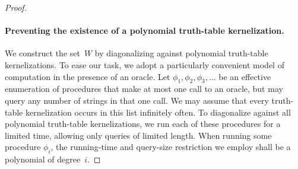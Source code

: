 \begin{proof}
  \paragraph{Preventing the existence of a polynomial truth-table kernelization.}
  We construct the set~$W$ by diagonalizing against polynomial truth-table kernelizations.
  To ease our task, we adopt a particularly convenient model of computation in the presence of an oracle.
  Let $\phi_1, \phi_2, \phi_3, \ldots$ be an effective enumeration of procedures that make at most one call to an oracle, but may query any number of strings in that one call.
  We may assume that every truth-table kernelization occurs in this list infinitely often.
  To diagonalize against all polynomial truth-table kernelizations, we run each of these procedures for a limited time, allowing only queries of limited length.
  When running some procedure $\phi_i$, the running-time and query-size restriction we employ shall be a polynomial of degree~$i$.


\end{proof}
